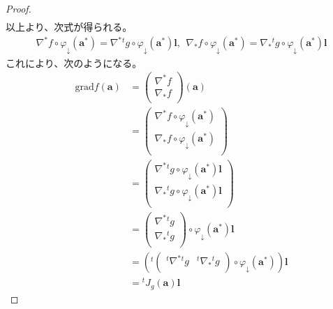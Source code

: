 \documentclass[dvipdfmx]{jsarticle}
\begin{document}
\begin{proof}
\begin{align*}
\end{align*}
以上より、次式が得られる。
\begin{align*}
\nabla^{*}f \circ \varphi_{\downarrow}\left( \mathbf{a}^{*} \right) = \nabla^{*}{}^t g \circ \varphi_{\downarrow}\left( \mathbf{a}^{*} \right)\mathbf{l},\ \ \nabla_{*}f \circ \varphi_{\downarrow}\left( \mathbf{a}^{*} \right) = \nabla_{*}{}^t g \circ \varphi_{\downarrow}\left( \mathbf{a}^{*} \right)\mathbf{l}
\end{align*}
これにより、次のようになる。
\begin{align*}
\mathrm{grad}f\left( \mathbf{a} \right) &= \begin{pmatrix}
\nabla^{*}f \\
\nabla_{*}f \\
\end{pmatrix}\left( \mathbf{a} \right)\\
&= \begin{pmatrix}
\nabla^{*}f \circ \varphi_{\downarrow}\left( \mathbf{a}^{*} \right) \\
\nabla_{*}f \circ \varphi_{\downarrow}\left( \mathbf{a}^{*} \right) \\
\end{pmatrix}\\
&= \begin{pmatrix}
\nabla^{*}{}^t g \circ \varphi_{\downarrow}\left( \mathbf{a}^{*} \right)\mathbf{l} \\
\nabla_{*}{}^t g \circ \varphi_{\downarrow}\left( \mathbf{a}^{*} \right)\mathbf{l} \\
\end{pmatrix}\\
&= \begin{pmatrix}
\nabla^{*}{}^t g \\
\nabla_{*}{}^t g \\
\end{pmatrix} \circ \varphi_{\downarrow}\left( \mathbf{a}^{*} \right)\mathbf{l}\\
&= \left({}^t \begin{pmatrix}
{}^t \nabla^{*}{}^t g &{}^t \nabla_{*}{}^t g \\
\end{pmatrix} \circ \varphi_{\downarrow}\left( \mathbf{a}^{*} \right) \right)\mathbf{l}\\
&={}^t J_{g}\left( \mathbf{a} \right)\mathbf{l}
\end{align*}
\end{proof}
\end{document}
